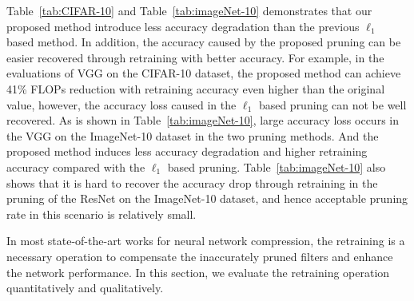 \documentclass{article} %
\begin{document}

Table~\ref{tab:CIFAR-10} and Table~\ref{tab:imageNet-10} demonstrates that our proposed method introduce less accuracy degradation than the previous $\ell_1$ based method. 
In addition, the accuracy caused by the proposed pruning can be easier recovered through retraining with better accuracy. 
For example, in the evaluations of VGG on the CIFAR-10 dataset, the proposed method can achieve 41\% FLOPs reduction with retraining accuracy even higher than the original value, however, the accuracy loss caused in the $\ell_1$ based pruning can not be well recovered.
As is shown in Table~\ref{tab:imageNet-10}, large accuracy loss occurs in the VGG on the ImageNet-10 dataset in the two pruning methods. 
And the proposed method induces less accuracy degradation and higher retraining accuracy compared with the $\ell_1$ based pruning.
Table~\ref{tab:imageNet-10} also shows that it is hard to recover the accuracy drop through retraining in the pruning of the ResNet on the ImageNet-10 dataset, and hence acceptable pruning rate in this scenario is relatively small.

In most state-of-the-art works for neural network compression, the retraining is a necessary operation to compensate the inaccurately pruned filters and enhance the network performance.
In this section, we evaluate the retraining operation quantitatively and qualitatively.
  
\end{document}
